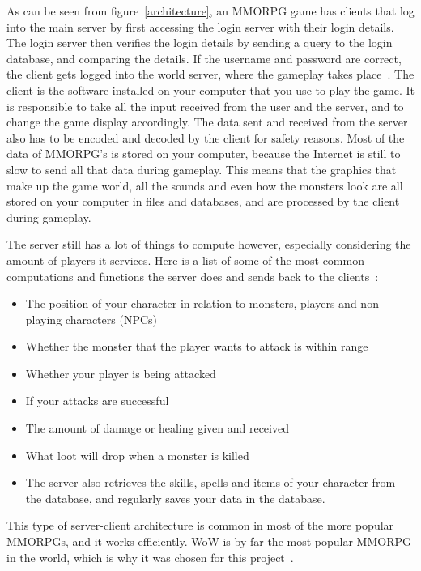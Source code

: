 As can be seen from figure~\ref{architecture}, an MMORPG game has clients that log into the main server by first accessing the login server with their login details. The login server then verifies the login details by sending a query to the login database, and comparing the details. If the username and password are correct, the client gets logged into the world server, where the gameplay takes place~\cite{mmorpgarch}. The client is the software installed on your computer that you use to play the game. It is responsible to take all the input received from the user and the server, and to change the game display accordingly. The data sent and received from the server also has to be encoded and decoded by the client for safety reasons. Most of the data of MMORPG's is stored on your computer, because the Internet is still to slow to send all that data during gameplay. This means that the graphics that make up the game world, all the sounds and even how the monsters look are all stored on your computer in files and databases, and are processed by the client during gameplay.

The server still has a lot of things to compute however, especially considering the amount of players it services. Here is a list of some of the most common computations and functions the server does and sends back to the clients~\cite{serverclient}:

\begin{itemize}
    \item The position of your character in relation to monsters, players and non-playing characters (NPCs)
	\item Whether the monster that the player wants to attack is within range
	\item Whether your player is being attacked
	\item If your attacks are successful
	\item The amount of damage or healing given and received
	\item What loot will drop when a monster is killed
	\item The server also retrieves the skills, spells and items of your character from the database, and regularly saves your data in the database.
\end{itemize}

This type of server-client architecture is common in most of the more popular MMORPGs, and it works efficiently.  %
%
WoW is by far the most popular MMORPG in the world, which is why it was chosen for this project~\cite{subscription}.


